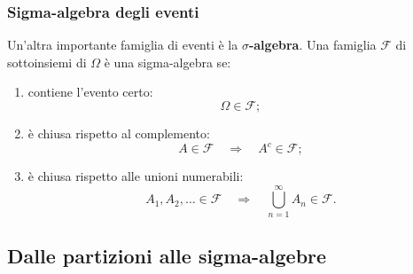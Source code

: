 \documentclass[handout]{beamer}%
\newenvironment{stepenumerate}{\begin{enumerate}[<+->]}{\end{enumerate}}
\providecommand{\F}{\mathcal{F}}
\providecommand{\1}{\mathbf{1}}
\providecommand{\QTR}[2]{\csname #1\endcsname{#2}}
\begin{document}
\begin{frame}%
%

\frametitle{Sigma-algebra degli eventi}%


Un'altra importante famiglia di eventi \`{e} la \textbf{$\sigma$-algebra}. Una
famiglia $\F$ di sottoinsiemi di $\Omega$ \`{e} una sigma-algebra se:

\medskip

\begin{stepenumerate}


\item[1.] contiene l'evento certo:
\[
\Omega\in\F;
\]


\item[2.] \`{e} chiusa rispetto al complemento:
\[
A\in\F \quad\Longrightarrow\quad A^{c}\in\F;
\]


\item[3.] \`{e} chiusa rispetto alle unioni numerabili:
\[
A_{1},A_{2},\ldots\in\F
\quad\Longrightarrow\quad\bigcup_{n=1}^{\infty}A_{n}\in\F.
\]

\end{stepenumerate}%

\transboxout
\end{frame}%




\subsection{Dalle partizioni alle sigma-algebre}%
\end{document}
